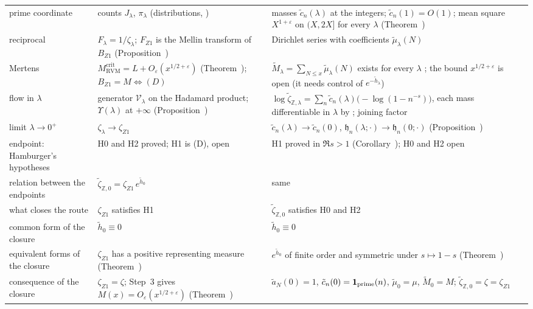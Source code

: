 \documentclass[11pt,reqno]{amsart}
\makeatletter
\let\CG@origref\ref
\let\CG@origeqref\eqref
\newcommand{\CG@gettip}[1]{\@ifundefined{CGTip@#1}{Reference: #1}{\csname CGTip@#1\endcsname}}
\DeclareRobustCommand{\CGref}[1]{\pdftooltip{\CG@origref{#1}}{\CG@gettip{#1}}}
\DeclareRobustCommand{\CGeqref}[1]{\pdftooltip{\CG@origeqref{#1}}{\CG@gettip{#1}}}
\numberwithin{equation}{section}
\theoremstyle{plain}
\theoremstyle{definition}
\theoremstyle{remark}
\newcommand{\Z}{\mathbb Z}
\newcommand{\eps}{\varepsilon}
\newcommand{\RVM}{\mathrm{RVM}}
\newcommand{\crit}{\mathrm{crit}}
\makeatother
\begin{document}
\begin{longtable}{>{\raggedright\arraybackslash}p{}>{\raggedright\arraybackslash}p{}>{\raggedright\arraybackslash}p{}}
prime coordinate & counts $J_\lambda$, $\pi_\lambda$ (distributions, \CGeqref{eq:J-X}) & masses $\tilde c_n(\lambda)$ at the integers; $\tilde c_n(1)=O(1)$; mean square $X^{1+\eps}$ on $(X,2X]$ for every $\lambda$ (Theorem~\CGref{thm:mean-square-cells})\\
reciprocal & $F_\lambda=1/\zeta_\lambda$; $F_{Z1}$ is the Mellin transform of $B_{Z1}$ (Proposition~\CGref{prop:Mellin-Mertens}) & Dirichlet series with coefficients $\tilde\mu_\lambda(N)$ \CGeqref{eq:atomized-mobius}\\
Mertens & $M^{\crit}_{\RVM}=L+O_\eps(x^{1/2+\eps})$ (Theorem~\CGref{thm:unsmoothed-RVM}); $B_{Z1}=M\iff(D)$ & $\tilde M_\lambda=\sum_{N\le x}\tilde\mu_\lambda(N)$ exists for every $\lambda$ \CGeqref{eq:atomized-mertens}; the bound $x^{1/2+\eps}$ is open (it needs control of $e^{-\tilde h_\lambda}$)\\
flow in $\lambda$ & generator $\mathcal V_\lambda$ on the Hadamard product; $\Upsilon(\lambda)$ at $+\infty$ (Proposition~\CGref{prop:family-flow}) & $\log\tilde\zeta_{\Z,\lambda}=\sum_n\tilde c_n(\lambda)\bigl(-\log(1-n^{-s})\bigr)$, each mass differentiable in $\lambda$ by \CGeqref{eq:J-lambda-derivative}; joining factor \CGeqref{eq:joining-derivative}\\
limit $\lambda\to0^+$ & $\zeta_\lambda\to\zeta_{Z1}$ & $\tilde c_n(\lambda)\to\tilde c_n(0)$, $\mathfrak h_n(\lambda;\cdot)\to\mathfrak h_n(0;\cdot)$ (Proposition~\CGref{prop:cell-limit})\\
endpoint: Hamburger's hypotheses & H0 and H2 proved; H1 is (D), open & H1 proved in $\Re s>1$ (Corollary~\CGref{cor:abscissa-one}); H0 and H2 open\\
relation between the endpoints & $\tilde\zeta_{\Z,0}=\zeta_{Z1}\,e^{\tilde h_0}$ & same\\
what closes the route & $\zeta_{Z1}$ satisfies H1 & $\tilde\zeta_{\Z,0}$ satisfies H0 and H2\\
common form of the closure & $\tilde h_0\equiv0$ & $\tilde h_0\equiv0$\\
equivalent forms of the closure & $\zeta_{Z1}$ has a positive representing measure (Theorem~\CGref{thm:positivity}) & $e^{\tilde h_0}$ of finite order and symmetric under $s\mapsto1-s$ (Theorem~\CGref{thm:pair-criterion})\\
consequence of the closure & $\zeta_{Z1}=\zeta$; Step~3 gives $M(x)=O_\eps(x^{1/2+\eps})$ (Theorem~\CGref{thm:step3}) & $\tilde a_N(0)=1$, $\tilde c_n(0)=\mathbf 1_{\rm prime}(n)$, $\tilde\mu_0=\mu$, $\tilde M_0=M$; $\tilde\zeta_{\Z,0}=\zeta=\zeta_{Z1}$\\
\end{longtable}
\endgroup
\end{document}
